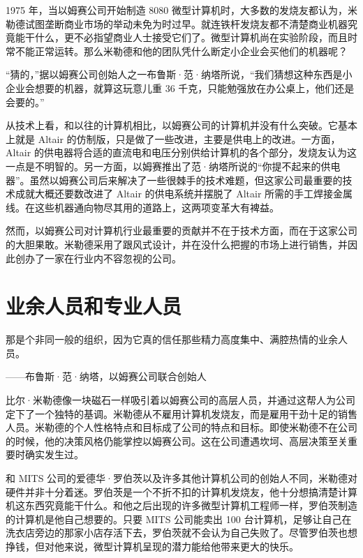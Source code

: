 \documentclass[12pt,UTF8]{ctexbook}
\begin{document}
1975 年，当以姆赛公司开始制造 8080 微型计算机时，大多数的发烧友都认为，米勒德试图垄断商业市场的举动未免为时过早。就连铁杆发烧友都不清楚商业机器究竟能干什么，更不必指望商业人士接受它们了。微型计算机尚在实验阶段，而且时常不能正常运转。那么米勒德和他的团队凭什么断定小企业会买他们的机器呢？

“猜的，”据以姆赛公司创始人之一布鲁斯·范·纳塔所说，“我们猜想这种东西是小企业会想要的机器，就算这玩意儿重 36 千克，只能勉强放在办公桌上，他们还是会要的。”

从技术上看，和以往的计算机相比，以姆赛公司的计算机并没有什么突破。它基本上就是 Altair 的仿制版，只是做了一些改进，主要是供电上的改进。一方面，Altair 的供电器将合适的直流电和电压分别供给计算机的各个部分，发烧友认为这一点是不明智的。另一方面，以姆赛推出了范·纳塔所说的“你提不起来的供电器”。虽然以姆赛公司后来解决了一些很棘手的技术难题，但这家公司最重要的技术成就大概还要数改进了 Altair 的供电系统并摆脱了 Altair 所需的手工焊接金属线。在这些机器通向物尽其用的道路上，这两项变革大有裨益。

然而，以姆赛公司对计算机行业最重要的贡献并不在于技术方面，而在于这家公司的大胆果敢。米勒德采用了跟风式设计，并在没什么把握的市场上进行销售，并因此创办了一家在行业内不容忽视的公司。





\section{业余人员和专业人员}


那是个非同一般的组织，因为它真的信任那些精力高度集中、满腔热情的业余人员。

——布鲁斯·范·纳塔，以姆赛公司联合创始人



比尔·米勒德像一块磁石一样吸引着以姆赛公司的高层人员，并通过这帮人为公司定下了一个独特的基调。米勒德从不雇用计算机发烧友，而是雇用干劲十足的销售人员。米勒德的个人性格特点和目标成了公司的特点和目标。即使米勒德不在公司的时候，他的决策风格仍能掌控以姆赛公司。这在公司遭遇坎坷、高层决策至关重要时确实发生过。

和 MITS 公司的爱德华·罗伯茨以及许多其他计算机公司的创始人不同，米勒德对硬件并非十分着迷。罗伯茨是一个不折不扣的计算机发烧友，他十分想搞清楚计算机这东西究竟能干什么。和他之后出现的许多微型计算机工程师一样，罗伯茨制造的计算机是他自己想要的。只要 MITS 公司能卖出 100 台计算机，足够让自己在洗衣店旁边的那家小店存活下去，罗伯茨就不会认为自己失败了。尽管罗伯茨也想挣钱，但对他来说，微型计算机呈现的潜力能给他带来更大的快乐。
\end{document}
